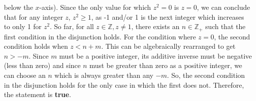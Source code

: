 \documentclass[letterpaper, 12pt]{article}
\newcommand{\keyword}[1]{\textbf{#1}}
\begin{document}
\begin{enumerate}
\begin{flushleft}
    below the $x$-axis). Since the only value for which $z^2 = 0$ is $z = 0$, we can conclude that for 
    any integer $z$, $z^2 \ge 1$, as -1 and/or 1 is the next integer which increases to only 1 for $z^2$.
    So far, for all $z \in \mathbb{Z}, z \ne 1$, there exists an $n \in \mathbb{Z}_+$ such that the first
    condition in the disjunction holds. For the condition where $z = 0$, the second condition holds when 
    $z < n + m$. This can be algebraically rearranged to get $n > -m$. Since $m$ must be a positive integer, 
    its additive inverse must be negative (less than zero) and since $n$ must be greater than zero as a positive
    integer, we can choose an $n$ which is always greater than any $-m$. So, the second condition in the
    disjunction holds for the only case in which the first does not. Therefore, the statement is \keyword{true}.
\end{flushleft}
\end{enumerate}
\end{document}

